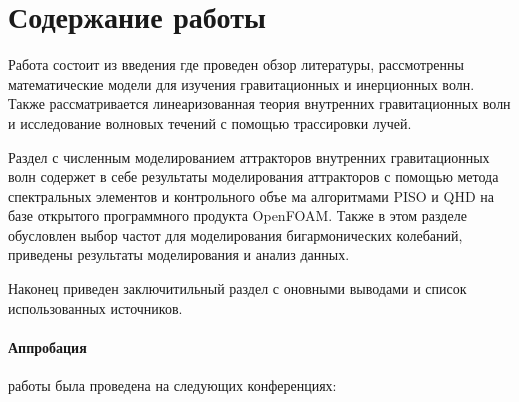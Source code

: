\documentclass[utf8x]{G7-32} %
\begin{document}
\section{Содержание работы}

Работа состоит из введения где проведен обзор литературы, рассмотренны математические модели для изучения гравитационных и инерционных волн. Также рассматривается линеаризованная теория внутренних гравитационных волн и исследование волновых течений с помощью трассировки лучей.

Раздел с численным моделированием аттракторов внутренних гравитационных волн содержет в себе результаты моделирования аттракторов с помощью метода спектральных элементов и контрольного объе ма алгоритмами PISO и QHD на базе открытого программного продукта OpenFOAM. Также в этом разделе обусловлен выбор частот для моделирования бигармонических колебаний, приведены результаты моделирования и анализ данных.

Наконец приведен заключитильный раздел с оновными выводами и список использованных источников. 


%
%    
%    
%    
%    

\paragraph{Аппробация} работы была проведена на следующих конференциях:
\end{document}
